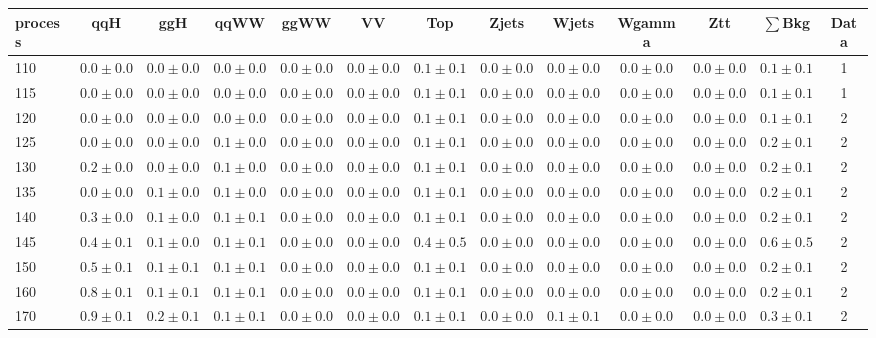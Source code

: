 \begin{table}
{%
 \tiny
 \begin{center}
 \begin{tabular}{l | c c | c c c c c c c c  | c c}
 \hline
 process & qqH & ggH & qqWW & ggWW & VV & Top & Zjets & Wjets & Wgamma & Ztt & $\sum$Bkg & Data \\
 \hline
110 & $0.0\pm0.0$ & $0.0\pm0.0$ & $0.0\pm0.0$ & $0.0\pm0.0$ & $0.0\pm0.0$ & $0.1\pm0.1$ & $0.0\pm0.0$ & $0.0\pm0.0$ & $0.0\pm0.0$ & $0.0\pm0.0$ & $0.1\pm0.1$ & 1 \\
115 & $0.0\pm0.0$ & $0.0\pm0.0$ & $0.0\pm0.0$ & $0.0\pm0.0$ & $0.0\pm0.0$ & $0.1\pm0.1$ & $0.0\pm0.0$ & $0.0\pm0.0$ & $0.0\pm0.0$ & $0.0\pm0.0$ & $0.1\pm0.1$ & 1 \\
120 & $0.0\pm0.0$ & $0.0\pm0.0$ & $0.0\pm0.0$ & $0.0\pm0.0$ & $0.0\pm0.0$ & $0.1\pm0.1$ & $0.0\pm0.0$ & $0.0\pm0.0$ & $0.0\pm0.0$ & $0.0\pm0.0$ & $0.1\pm0.1$ & 2 \\
125 & $0.0\pm0.0$ & $0.0\pm0.0$ & $0.1\pm0.0$ & $0.0\pm0.0$ & $0.0\pm0.0$ & $0.1\pm0.1$ & $0.0\pm0.0$ & $0.0\pm0.0$ & $0.0\pm0.0$ & $0.0\pm0.0$ & $0.2\pm0.1$ & 2 \\
130 & $0.2\pm0.0$ & $0.0\pm0.0$ & $0.1\pm0.0$ & $0.0\pm0.0$ & $0.0\pm0.0$ & $0.1\pm0.1$ & $0.0\pm0.0$ & $0.0\pm0.0$ & $0.0\pm0.0$ & $0.0\pm0.0$ & $0.2\pm0.1$ & 2 \\
135 & $0.0\pm0.0$ & $0.1\pm0.0$ & $0.1\pm0.0$ & $0.0\pm0.0$ & $0.0\pm0.0$ & $0.1\pm0.1$ & $0.0\pm0.0$ & $0.0\pm0.0$ & $0.0\pm0.0$ & $0.0\pm0.0$ & $0.2\pm0.1$ & 2 \\
140 & $0.3\pm0.0$ & $0.1\pm0.0$ & $0.1\pm0.1$ & $0.0\pm0.0$ & $0.0\pm0.0$ & $0.1\pm0.1$ & $0.0\pm0.0$ & $0.0\pm0.0$ & $0.0\pm0.0$ & $0.0\pm0.0$ & $0.2\pm0.1$ & 2 \\
145 & $0.4\pm0.1$ & $0.1\pm0.0$ & $0.1\pm0.1$ & $0.0\pm0.0$ & $0.0\pm0.0$ & $0.4\pm0.5$ & $0.0\pm0.0$ & $0.0\pm0.0$ & $0.0\pm0.0$ & $0.0\pm0.0$ & $0.6\pm0.5$ & 2 \\
150 & $0.5\pm0.1$ & $0.1\pm0.1$ & $0.1\pm0.1$ & $0.0\pm0.0$ & $0.0\pm0.0$ & $0.1\pm0.1$ & $0.0\pm0.0$ & $0.0\pm0.0$ & $0.0\pm0.0$ & $0.0\pm0.0$ & $0.2\pm0.1$ & 2 \\
160 & $0.8\pm0.1$ & $0.1\pm0.1$ & $0.1\pm0.1$ & $0.0\pm0.0$ & $0.0\pm0.0$ & $0.1\pm0.1$ & $0.0\pm0.0$ & $0.0\pm0.0$ & $0.0\pm0.0$ & $0.0\pm0.0$ & $0.2\pm0.1$ & 2 \\
170 & $0.9\pm0.1$ & $0.2\pm0.1$ & $0.1\pm0.1$ & $0.0\pm0.0$ & $0.0\pm0.0$ & $0.1\pm0.1$ & $0.0\pm0.0$ & $0.1\pm0.1$ & $0.0\pm0.0$ & $0.0\pm0.0$ & $0.3\pm0.1$ & 2 \\

\end{tabular}
\end{center}}
\end{table}
